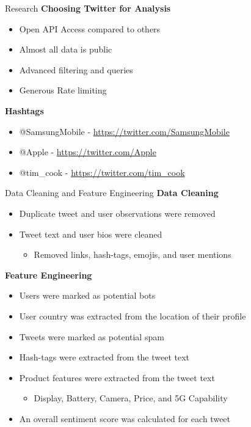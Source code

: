 \documentclass[
  ignorenonframetext,
]{beamer}
\providecommand{\tightlist}{%
  \setlength{\itemsep}{0pt}\setlength{\parskip}{0pt}}
\begin{document}
\begin{frame}{Research}
\protect\hypertarget{research}{}
\textbf{Choosing Twitter for Analysis}

\begin{itemize}
\tightlist
\item
  Open API Access compared to others
\item
  Almost all data is public
\item
  Advanced filtering and queries
\item
  Generous Rate limiting
\end{itemize}

\textbf{Hashtags}

\begin{itemize}
\tightlist
\item
  @SamsungMobile - \url{https://twitter.com/SamsungMobile}
\item
  @Apple - \url{https://twitter.com/Apple}
\item
  @tim\_cook - \url{https://twitter.com/tim_cook}
\end{itemize}
\end{frame}

\begin{frame}{Data Cleaning and Feature Engineering}
\protect\hypertarget{data-cleaning-and-feature-engineering}{}
\textbf{Data Cleaning}

\begin{itemize}
\tightlist
\item
  Duplicate tweet and user observations were removed
\item
  Tweet text and user bios were cleaned

  \begin{itemize}
  \tightlist
  \item
    Removed links, hash-tags, emojis, and user mentions
  \end{itemize}
\end{itemize}

\textbf{Feature Engineering}

\begin{itemize}
\tightlist
\item
  Users were marked as potential bots
\item
  User country was extracted from the location of their profile
\item
  Tweets were marked as potential spam
\item
  Hash-tags were extracted from the tweet text
\item
  Product features were extracted from the tweet text

  \begin{itemize}
  \tightlist
  \item
    Display, Battery, Camera, Price, and 5G Capability
  \end{itemize}
\item
  An overall sentiment score was calculated for each tweet
\end{itemize}
\end{frame}
\end{document}

